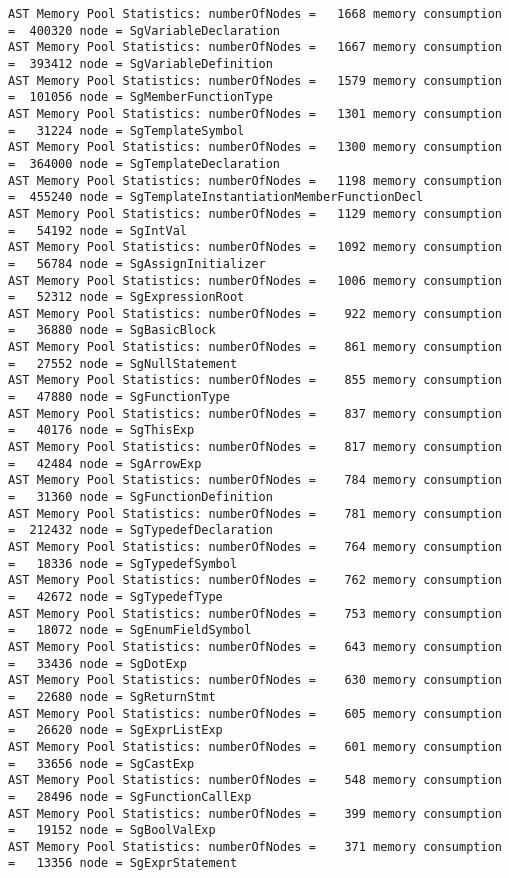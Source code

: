 {\begin{verbatim}
AST Memory Pool Statistics: numberOfNodes =   1668 memory consumption =  400320 node = SgVariableDeclaration
AST Memory Pool Statistics: numberOfNodes =   1667 memory consumption =  393412 node = SgVariableDefinition
AST Memory Pool Statistics: numberOfNodes =   1579 memory consumption =  101056 node = SgMemberFunctionType
AST Memory Pool Statistics: numberOfNodes =   1301 memory consumption =   31224 node = SgTemplateSymbol
AST Memory Pool Statistics: numberOfNodes =   1300 memory consumption =  364000 node = SgTemplateDeclaration
AST Memory Pool Statistics: numberOfNodes =   1198 memory consumption =  455240 node = SgTemplateInstantiationMemberFunctionDecl
AST Memory Pool Statistics: numberOfNodes =   1129 memory consumption =   54192 node = SgIntVal
AST Memory Pool Statistics: numberOfNodes =   1092 memory consumption =   56784 node = SgAssignInitializer
AST Memory Pool Statistics: numberOfNodes =   1006 memory consumption =   52312 node = SgExpressionRoot
AST Memory Pool Statistics: numberOfNodes =    922 memory consumption =   36880 node = SgBasicBlock
AST Memory Pool Statistics: numberOfNodes =    861 memory consumption =   27552 node = SgNullStatement
AST Memory Pool Statistics: numberOfNodes =    855 memory consumption =   47880 node = SgFunctionType
AST Memory Pool Statistics: numberOfNodes =    837 memory consumption =   40176 node = SgThisExp
AST Memory Pool Statistics: numberOfNodes =    817 memory consumption =   42484 node = SgArrowExp
AST Memory Pool Statistics: numberOfNodes =    784 memory consumption =   31360 node = SgFunctionDefinition
AST Memory Pool Statistics: numberOfNodes =    781 memory consumption =  212432 node = SgTypedefDeclaration
AST Memory Pool Statistics: numberOfNodes =    764 memory consumption =   18336 node = SgTypedefSymbol
AST Memory Pool Statistics: numberOfNodes =    762 memory consumption =   42672 node = SgTypedefType
AST Memory Pool Statistics: numberOfNodes =    753 memory consumption =   18072 node = SgEnumFieldSymbol
AST Memory Pool Statistics: numberOfNodes =    643 memory consumption =   33436 node = SgDotExp
AST Memory Pool Statistics: numberOfNodes =    630 memory consumption =   22680 node = SgReturnStmt
AST Memory Pool Statistics: numberOfNodes =    605 memory consumption =   26620 node = SgExprListExp
AST Memory Pool Statistics: numberOfNodes =    601 memory consumption =   33656 node = SgCastExp
AST Memory Pool Statistics: numberOfNodes =    548 memory consumption =   28496 node = SgFunctionCallExp
AST Memory Pool Statistics: numberOfNodes =    399 memory consumption =   19152 node = SgBoolValExp
AST Memory Pool Statistics: numberOfNodes =    371 memory consumption =   13356 node = SgExprStatement

\end{verbatim}}
